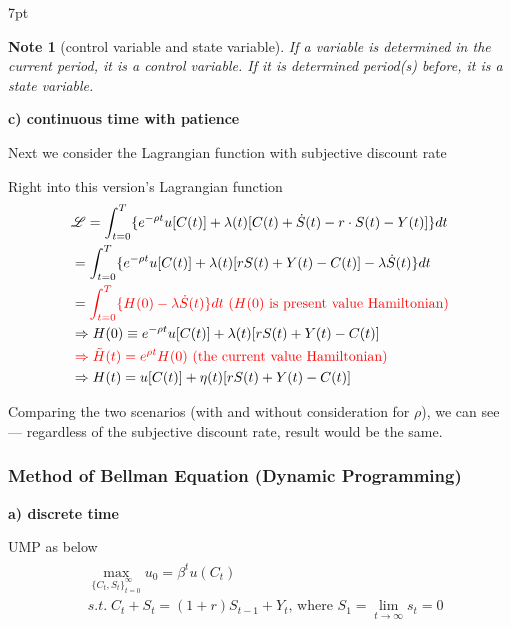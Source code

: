 \documentclass{article}
\newenvironment{blueblock}{
\def\FrameCommand{
  \hspace{1pt}
    {\color{DarkBlue}
    \vrule width 2pt}
    {\color{blueshade}
    \vrule width 4pt}
  \colorbox{blueshade}
}
\MakeFramed{
  \advance
  \hsize-
  \width
  \FrameRestore}
\noindent\hspace{-4.55pt}%
\begin{adjustwidth}{}{7pt}
\vspace{2pt}\vspace{2pt}
}
{\vspace{2pt}\end{adjustwidth}\endMakeFramed}
\newtheorem{note}{Note}
\begin{document}
\begin{blueblock}
\begin{note}[control variable and state variable]
If a variable is determined in the current period, it is a control variable. If it is determined period(s) before, it is a state variable.
\end{note}
\end{blueblock}

\textbf{c) continuous time with patience}

Next we consider the Lagrangian function with subjective discount rate

Right into this version's Lagrangian function
\begin{align}
&\mathscr{L}=\int_{t=0}^{T} \{e^{-\rho t}u[C(t)]+\lambda(t)[C(t)+\dot{S}(t)-r \cdot S(t)-Y(t)]\}dt
\\&=\int_{t=0}^{T} \{e^{-\rho t} u[C(t)]+\lambda(t)[r S(t)+Y(t)-C(t)]-\lambda \dot S(t)\}dt
\\&=\color{red}\int_{t=0}^{T} \{H(0)-\lambda \dot S(t)\}dt \text{ (} H(0) \text{ is present value Hamiltonian)}
\\& \Rightarrow H(0)\equiv e^{-\rho t} u[C(t)]+\lambda(t)[r S(t)+Y(t)-C(t)]
\\& \color{red} \Rightarrow \tilde{H}(t)= e^{\rho t}H(0) \text{ (the current value Hamiltonian)}
\\& \Rightarrow H(t)=u[C(t)]+\eta(t)[r S(t)+Y(t)-C(t)]
\end{align}

Comparing the two scenarios (with and without consideration for
$\rho$), we can see --- regardless of the subjective discount rate, result would be the same.

\subsubsection{Method of Bellman Equation (Dynamic
Programming)}\label{method-of-bellman-equation-dynamic-programming}

\textbf{a) discrete time} 

UMP as below
\begin{align}
\begin{split}
&\max_{\{C_{t}, S_{t}\}_{t=0}^{\infty}} u_{0}=\beta^{t}u(C_{t})
\\&s.t. \; C_{t}+S_{t}=(1+r)S_{t-1}+Y_{t} \text{, where }S_{1}=\lim_{t \rightarrow \infty} s_{t}=0
\end{split}
\end{align}
\end{document}
